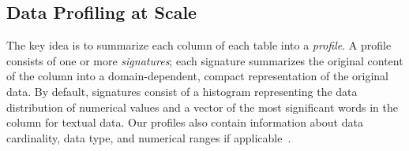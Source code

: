 \subsection{Data Profiling at Scale}

The key idea   is to summarize each column of each table into a {\em profile}.
A profile consists of one or more {\it signatures};  each signature summarizes
the original content of the column into a domain-dependent, compact
representation of the original data.  By default, signatures consist of a
histogram representing the data distribution of numerical values and  a vector
of the most significant words in the column for textual data.  Our profiles also
contain information about data cardinality, data type, and numerical ranges if
applicable~\cite{profiling_survey}.


